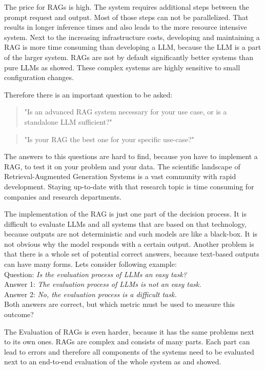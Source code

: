 The price for RAGs is high. The system requires additional steps between the prompt request and output. Most of those steps can not be parallelized. That results in longer inference times and also leads to the more resource intensive system. Next to the increasing infrastructure costs, developing and maintaining a RAG is more time consuming than developing a LLM, because the LLM is a part of the larger system. RAGs are not by default significantly better systems than pure LLMs as \citet{Simon.10112024} showed. These complex systems are highly sensitive to small configuration changes.

Therefore there is an important question to be asked: 
\begin{quotation}
    "Is an advanced RAG system necessary for your use case, or is a standalone LLM sufficient?"
\end{quotation}
\begin{quotation}
    "Is your RAG the best one for your specific use-case?"
\end{quotation}

The answers to this questions are hard to find, because you have to implement a RAG, to test it on your problem and your data. The scientific landscape of Retrieval-Augmented Generation Systems is a vast community with rapid development. Staying up-to-date with that research topic is time consuming for companies and research departments. 

The implementation of the RAG is just one part of the decision process. It is difficult to evaluate LLMs and all systems that are based on that technology, because outputs are not deterministic and such models are like a black-box. It is not obvious why the model responds with a certain output. Another problem is that there is a whole set of potential correct answers, because text-based outputs can have many forms. Lets consider following example:\\

Question: \textit{Is the evaluation process of LLMs an easy task?}\\
Answer 1: \textit{The evaluation process of LLMs is not an easy task.}\\
Answer 2: \textit{No, the evaluation process is a difficult task.}\\[6pt]

Both answers are correct, but which metric must be used to measure this outcome? 

The Evaluation of RAGs is even harder, because it has the same problems next to its own ones. RAGs are complex and consists of many parts. Each part can lead to errors and therefore all components of the systems need to be evaluated next to an end-to-end evaluation of the whole system as \citet{Salemi.2024} and \citet{Yu.2024} showed.

